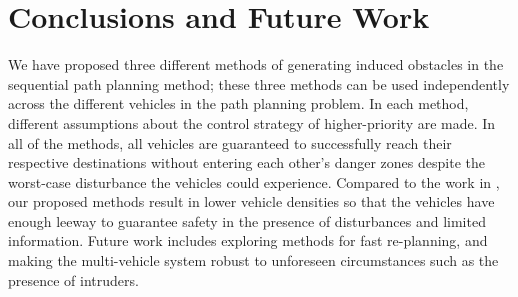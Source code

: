 \section{Conclusions and Future Work}
We have proposed three different methods of generating induced obstacles in the sequential path planning method; these three methods can be used independently across the different vehicles in the path planning problem. In each method, different assumptions about the control strategy of higher-priority are made. In all of the methods, all vehicles are guaranteed to successfully reach their respective destinations without entering each other's danger zones despite the worst-case disturbance the vehicles could experience. Compared to the work in \cite{Chen15}, our proposed methods result in lower vehicle densities so that the vehicles have enough leeway to guarantee safety in the presence of disturbances and limited information. Future work includes exploring methods for fast re-planning, and making the multi-vehicle system robust to unforeseen circumstances such as the presence of intruders.